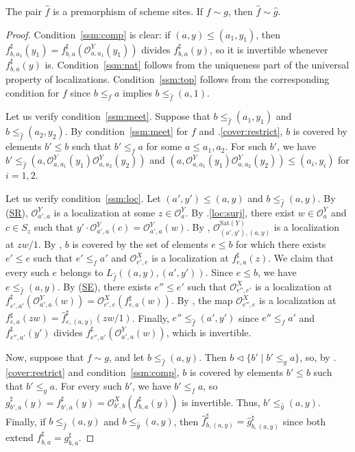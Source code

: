 \documentclass[reqno]{amsart}
\newcommand{\axref}[1]{(\hyperref[ax:#1]{#1})}
\theoremstyle{definition}
\theoremstyle{remark}
\numberwithin{figure}{section}
\newcommand{\cover}{\triangleleft}
\begin{document}
\begin{lem}[lift]
The pair $\widehat{f}$ is a premorphism of scheme sites.
If $f \sim g$, then $\widehat{f} \sim \widehat{g}$.
\end{lem}
\begin{proof}
Condition~\eqref{ssm:comp} is clear: if $(a,y) \leq (a_1,y_1)$, then $f^\sharp_{b,a_1}(y_1) = f^\sharp_{b,a}(\mathcal{O}^Y_{a,a_1}(y_1))$ divides $f^\sharp_{b,a}(y)$, so it is invertible whenever $f^\sharp_{b,a}(y)$ is.
Condition~\eqref{ssm:nat} follows from the uniqueness part of the universal property of localizations.
Condition~\eqref{ssm:top} follows from the corresponding condition for $f$ since $b \leq_f a$ implies $b \leq_{\widehat{f}} (a,1)$.

Let us verify condition~\eqref{ssm:meet}.
Suppose that $b \leq_{\widehat{f}} (a_1,y_1)$ and $b \leq_{\widehat{f}} (a_2,y_2)$.
By condition~\eqref{ssm:meet} for $f$ and .\eqref{cover:restrict}, $b$ is covered by elements $b' \leq b$ such that $b' \leq_f a$ for some $a \leq a_1, a_2$.
For such $b'$, we have $b' \leq_{\widehat{f}} (a, \mathcal{O}^Y_{a,a_1}(y_1) \mathcal{O}^Y_{a,a_2}(y_2))$ and $(a, \mathcal{O}^Y_{a,a_1}(y_1) \mathcal{O}^Y_{a,a_2}(y_2)) \leq (a_i,y_i)$ for $i = 1,2$.

Let us verify condition~\eqref{ssm:loc}.
Let $(a',y') \leq (a,y)$ and $b \leq_{\widehat{f}} (a,y)$.
By \axref{SR}, $\mathcal{O}^Y_{a',a}$ is a localization at some $z \in \mathcal{O}^Y_a$.
By .\eqref{loc:surj}, there exist $w \in \mathcal{O}^Y_a$ and $c \in S_z$ such that $y' \cdot \mathcal{O}^Y_{a',a}(c) = \mathcal{O}^Y_{a',a}(w)$.
By , $\mathcal{O}^{\mathrm{Sat}(Y)}_{(a',y'),(a,y)}$ is a localization at $z w / 1$.
By , $b$ is covered by the set of elements $e \leq b$ for which there exists $e' \leq e$ such that $e' \leq_f a'$ and $\mathcal{O}^X_{e',e}$ is a localization at $f^\sharp_{e,a}(z)$.
We claim that every such $e$ belongs to $L_{\widehat{f}}((a,y),(a',y'))$.
Since $e \leq b$, we have $e \leq_{\widehat{f}} (a,y)$.
By \axref{SE}, there exists $e'' \leq e'$ such that $\mathcal{O}^X_{e'',e'}$ is a localization at $f^\sharp_{e',a'}(\mathcal{O}^Y_{a',a}(w)) = \mathcal{O}^X_{e',e}(f^\sharp_{e,a}(w))$.
By , the map $\mathcal{O}^X_{e'',e}$ is a localization at $f^\sharp_{e,a}(z w) = \widehat{f}^\sharp_{e,(a,y)}(z w / 1)$.
Finally, $e'' \leq_{\widehat{f}} (a',y')$ since $e'' \leq_f a'$ and $f^\sharp_{e'',a'}(y')$ divides $f^\sharp_{e'',a'}(\mathcal{O}^Y_{a',a}(w))$, which is invertible.

Now, suppose that $f \sim g$, and let $b \leq_{\widehat{f}} (a,y)$.
Then $b \cover \{ b' \mid b' \leq_g a \}$, so, by .\eqref{cover:restrict} and condition~\eqref{ssm:comp}, $b$ is covered by elements $b' \leq b$ such that $b' \leq_g a$.
For every such $b'$, we have $b' \leq_f a$, so $g^\sharp_{b',a}(y) = f^\sharp_{b',a}(y) = \mathcal{O}^X_{b',b}(f^\sharp_{b,a}(y))$ is invertible.
Thus, $b' \leq_{\widehat{g}} (a,y)$.
Finally, if $b \leq_{\widehat{f}} (a,y)$ and $b \leq_{\widehat{g}} (a,y)$, then $\widehat{f}^\sharp_{b,(a,y)} = \widehat{g}^\sharp_{b,(a,y)}$ since both extend $f^\sharp_{b,a} = g^\sharp_{b,a}$.
\end{proof}
\end{document}
